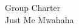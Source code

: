 \documentclass[12pt,A4paper]{article}
\begin{document}
\begin{center}
	\Large
	Group Charter \\
	\vspace{.25 in}
	\normalsize
	Just Me Mwahaha
\end{center}
\end{document}
